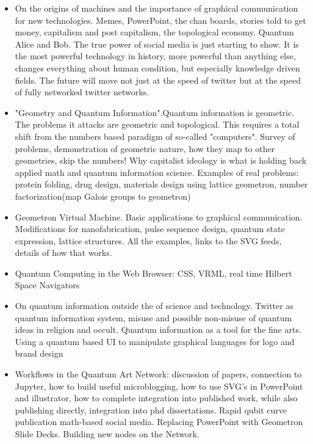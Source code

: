 \documentclass[11pt]{article}
\begin{document}
\begin{itemize}

    \item
On the origins of machines and the importance of graphical communication for new technologies.  Memes, PowerPoint, the chan boards, stories told to get money, capitalism and post capitalism, the topological economy. Quantum Alice and Bob. The true power of social media is just starting to show.  It is the most powerful technology in history, more powerful than anything else, changes everything about human condition, but especially knowledge driven fields.  The future will move not just at the speed of twitter but at the speed of fully networked twitter networks.
    \item
"Geometry and Quantum Information".Quantum information is geometric.  The problems it attacks are geometric and topological.  This requires a total shift from the numbers based paradigm of so-called "computers".  Survey of problems, demonstration of geometric nature, how they map to other geometries, skip the numbers! Why capitalist ideology is what is holding back applied math and quantum information science. Examples of real problems: protein folding, drug design, materials design using lattice geometron, number factorization(map Galois groups to geometron)
    \item
Geometron Virtual Machine.  Basic applications to graphical communication.  Modifications for nanofabrication, pulse sequence design, quantum state expression, lattice structures. All the examples, links to the SVG feeds, details of how that works.  
    \item
Quantum Computing in the Web Browser: CSS, VRML, real time Hilbert Space Navigators
    \item
On quantum information outside the of science and technology.  Twitter as quantum information system, misuse and possible non-misuse of quantum ideas in religion and occult.  Quantum information as a tool for the fine arts.  Using a quantum based UI to manipulate graphical languages for logo and brand design
    \item
Workflows in the Quantum Art Network: discussion of papers, connection to Jupyter, how to build useful microblogging, how to use SVG's in PowerPoint and illustrator, how to complete integration into published work, while also publishing directly, integration into phd dissertations.  Rapid qubit curve publication math-based social media.  Replacing PowerPoint with Geometron Slide Decks. Building new nodes on the Network. 
    
\end{itemize}
\end{document}

